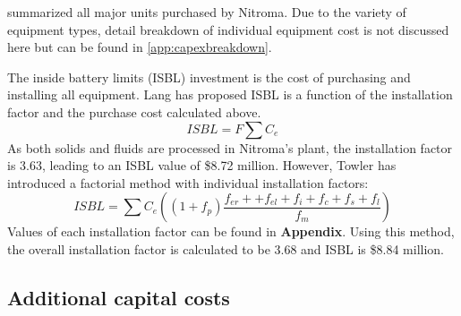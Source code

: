  summarized all major units purchased by Nitroma. Due to the variety of equipment types, detail breakdown of individual equipment cost is not discussed here but can be found in \cref{app:capexbreakdown}.

The inside battery limits (ISBL) investment is the cost of purchasing and installing all equipment. Lang has proposed ISBL is a function of the installation factor and the purchase cost calculated above.
\begin{equation}
    ISBL=F\sum C_{e}    
\end{equation}
As both solids and fluids are processed in Nitroma's plant, the installation factor is 3.63, leading to an ISBL value of \$8.72 million. However, Towler \cite{sinnott_chemical_2020} has introduced a factorial method with individual installation factors:
\begin{equation}
    ISBL=\sum C_{e}\left(\left(1+f_{p}\right)\frac{f_{er}++f_{el}+f_{i}+f_{c}+f_{s}+f_{l}}{f_{m}}\right)
\end{equation}
Values of each installation factor can be found in \textbf{Appendix}. Using this method, the overall installation factor is calculated to be 3.68 and ISBL is \$8.84 million.

\subsection{Additional capital costs}

